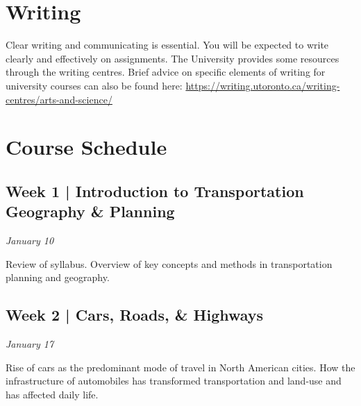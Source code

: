 \documentclass[11pt]{article}
\begin{document}
	
	\section*{Writing}
	
	Clear writing and communicating is essential. You will be expected to write clearly and effectively on
	assignments. The University provides some resources through the writing centres. Brief advice on
	specific elements of writing for university courses can also be found here:	
	\url{https://writing.utoronto.ca/writing-centres/arts-and-science/}
	


	\newpage
	
	\section*{Course Schedule}
	
	
	\subsection*{Week 1 | Introduction to Transportation Geography \& Planning}
	
	\textit{January 10}

	Review of syllabus. Overview of key concepts and methods in transportation planning and geography. 
	
	
	
	
		
	
	\subsection*{Week 2 | Cars, Roads, \& Highways}
	
	\textit{January 17}
	
	Rise of cars as the predominant mode of travel in North American cities. How the infrastructure of automobiles has transformed transportation and land-use and has affected daily life. 
	
\end{document}
